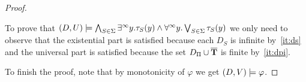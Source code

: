 \begin{proof}
\begin{pfclaim}
	To prove that $(D,U) \models \bigwedge_{S\in\Sigma} \exists^\infty y.\tau_S(y) \land \forall^\infty y.\bigvee_{S\in\Sigma} \tau_S(y)$ we only need to observe that the existential part is satisfied because each $D_S$ is infinite by~\eqref{it:ds} and the universal part is satisfied because the set $D_\Pi \cup \overline{{\mathbf{T}}}$ is finite by~\eqref{it:dpi}.
\end{pfclaim}
%
To finish the proof, note that by monotonicity of $\varphi$ we get $(D,V) \models \varphi$.
%
%

\end{proof}
